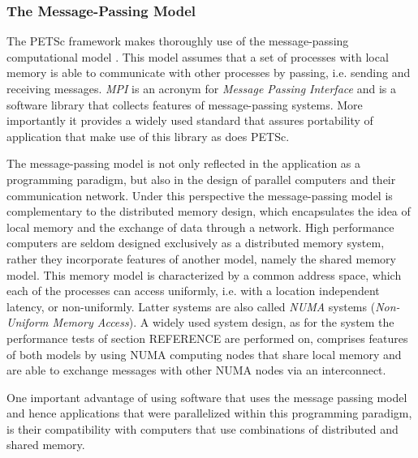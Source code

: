 \subsubsection{The Message-Passing Model}

The PETSc framework makes thoroughly use of the message-passing computational model \cite{gropp99}. This model assumes that a set of processes with local memory is able to communicate with other processes by passing, i.e. sending and receiving messages. \emph{MPI} is an acronym for \emph{Message Passing Interface} and is a software library that collects features of message-passing systems. More importantly it provides a widely used standard that assures portability of application that make use of this library as does PETSc. 

The message-passing model is not only reflected in the application as a programming paradigm, but also in the design of parallel computers and their communication network. Under this perspective the message-passing model is complementary to the distributed memory design, which encapsulates the idea of local memory and the exchange of data through a network. High performance computers are seldom designed exclusively as a distributed memory system, rather they incorporate features of another model, namely the shared memory model. This memory model is characterized by a common address space, which each of the processes can access uniformly, i.e. with a location independent latency, or non-uniformly. Latter systems are also called \emph{NUMA} systems (\emph{Non-Uniform Memory Access}). A widely used system design, as for the system the performance tests of section REFERENCE are performed on, comprises features of both models by using NUMA computing nodes that share local memory and are able to exchange messages with other NUMA nodes via an interconnect.

One important advantage of using software that uses the message passing model and hence applications that were parallelized within this programming paradigm, is their compatibility with computers that use combinations of distributed and shared memory.

